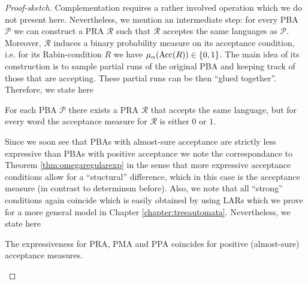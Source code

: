 \begin{proof}[Proof-sketch]
  Complementation requires a rather involved operation which we do not present 
  here. Nevertheless, we mention an intermediate step: for every \ac{PBA}
  $\mathcal{P}$ we can construct a \ac{PRA} $\mathcal{R}$ such that
  $\mathcal{R}$ acceptes the same languages as $\mathcal{P}$. Moreover,
  $\mathcal{R}$ induces a binary probability measure on its acceptance
  condition, i.e. for its Rabin-condition $R$ we have
  $\mu_{\alpha}(\operatorname{Acc}(R))\in\left\{0,1\right\}$. The main idea of its construction is to
  sample partial runs of the original \ac{PBA} and keeping track of those that
  are accepting. These partial runs can be then \enquote{glued together}.
  Therefore, we state here
  \begin{theorem}
    \cite[Theorem 4.3.2]{Groesser}
    For each \ac{PBA} $\mathcal{P}$ there exists a \ac{PRA} $\mathcal{R}$ that 
    accepts the same language, but for every word the acceptance measure for
    $\mathcal{R}$ is either $0$ or $1$.
    \label{thm:pbatopra}
  \end{theorem}
  Since we soon see that \acp{PBA} with almost-sure acceptance are strictly
  less expressive than \acp{PBA} with positive acceptance we note the 
  correspondance to Theorem \ref{thm:omegaregularexp} in the
  sense that more expressive acceptance conditions allow for a 
  \enquote{stuctural} difference, which in this case is the acceptance measure
  (in contrast to determinsm before). Also, we note that all \enquote{strong}
  conditions again coincide which is easily obtained by using \acp{LAR} which
  we prove for a more general model in Chapter \ref{chapter:treeautomata}.
  Nevertheless, we state here
  \begin{theorem}
    The expressiveness for \ac{PRA}, \ac{PMA} and \ac{PPA} coincides for
    positive (almost-sure) acceptance measures.
    \label{thm:probautoequiv}
  \end{theorem}
\end{proof}

